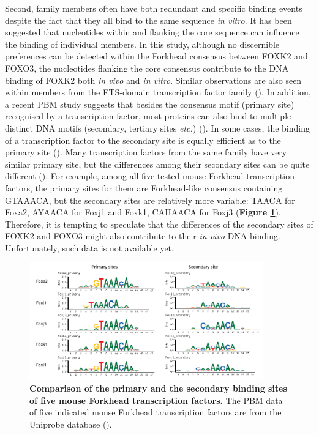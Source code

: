 Second, family members often have both redundant and specific binding events despite the fact that they all bind to the same sequence \textit{in vitro}. It has been suggested that nucleotides within and flanking the core sequence can influence the binding of individual members. In this study, although no discernible preferences can be detected within the Forkhead consensus between FOXK2 and FOXO3, the nucleotides flanking the core consensus contribute to the DNA binding of FOXK2 both \textit{in vivo} and \textit{in vitro}. Similar observations are also seen within members from the ETS-domain transcription factor family (\cite{wei2010genome-wide}). In addition, a recent PBM study suggests that besides the consensus motif (primary site) recognised by a transcription factor, most proteins can also bind to multiple distinct DNA motifs (secondary, tertiary sites \textit{etc.}) (\cite{badis2009diversity}). In some cases, the binding of a transcription factor to the secondary site is equally efficient as to the primary site (\cite{badis2009diversity}). Many transcription factors from the same family have very similar primary site, but the differences among their secondary sites can be quite different (\cite{badis2009diversity}). For example, among all five tested mouse Forkhead transcription factors, the primary sites for them are Forkhead-like consensus containing GTAAACA, but the secondary sites are relatively more variable: TAACA for Foxa2, AYAACA for Foxj1 and Foxk1, CAHAACA for Foxj3 (\textbf{Figure \ref{fig:fig54}}). Therefore, it is tempting to speculate that the differences of the secondary sites of FOXK2 and FOXO3 might also contribute to their \textit{in vivo} DNA binding. Unfortunately, such data is not available yet.

\begin{figure}[!h]
    \centering
    \includegraphics[width=0.9\textwidth]{chapter4/figures/fig54.pdf}
    \caption[Comparison of the primary and the secondary binding sites of five mouse Forkhead transcription factors]{\textbf{Comparison of the primary and the secondary binding sites of five mouse Forkhead transcription factors.} The PBM data of five indicated mouse Forkhead transcription factors are from the Uniprobe database (\cite{Newburger2009-uc}).}
    \label{fig:fig54}
\end{figure}

